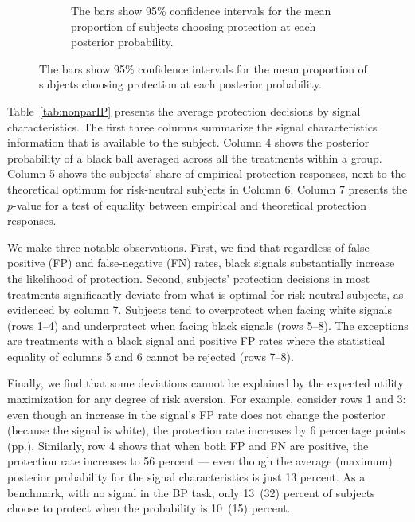 \documentclass[12pt,a4paper]{article}
\newcommand{\pmt}[1]{{\color{Blue}#1}}
\begin{document}
\begin{figure}[H]
\begin{subfigure}[t]{.45\textwidth}
\caption{The bars show 95\% confidence intervals for the mean proportion of subjects choosing protection at each posterior probability.}
\end{subfigure}
%
\end{figure}

Table~\ref{tab:nonparIP} presents the average protection decisions by signal characteristics. The first three columns summarize the signal characteristics information that is available to the subject. Column 4 shows the posterior probability of a black ball averaged across all the treatments within a group. Column 5 shows the subjects' share of empirical protection responses, next to the theoretical optimum for risk-neutral subjects in Column 6. Column 7 presents the $p$-value for a test of equality between empirical and theoretical protection responses.

We make three notable observations. First, we find that regardless of false-positive (FP) and false-negative (FN) rates, black signals substantially increase the likelihood of protection.  Second, subjects' protection decisions in most treatments significantly deviate from what is optimal for risk-neutral subjects, as evidenced by column 7. Subjects tend to overprotect when facing white signals (rows 1--4) and underprotect when facing black signals (rows 5--8). The exceptions are treatments with a black signal and positive FP rates where the statistical equality of columns 5 and 6 cannot be rejected (rows 7--8).

Finally, we find that some deviations cannot be explained by the expected utility maximization for any degree of risk aversion. For example, consider rows 1 and 3: even though an increase in the signal's FP rate does not change the posterior (because the signal is white), the protection rate increases by 6 percentage points (pp.). Similarly, row 4 shows that when both FP and FN are positive, the protection rate increases to 56 percent --- even though the average (maximum) posterior probability for the signal characteristics is just 13 percent. As a benchmark, with no signal in the BP task, only 13~(32) percent of subjects choose to protect when the probability is 10~(15) percent. 
\end{document}
